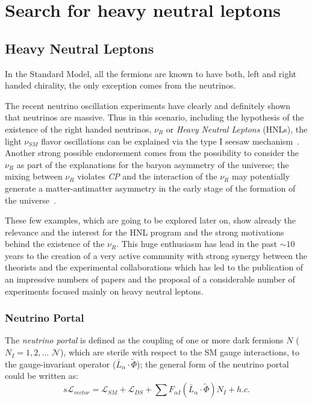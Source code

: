 
\part {Search for heavy neutral leptons}


\chapter{Heavy Neutral Leptons} 
\label{Chapter3} 


In the Standard Model, all the fermions are known to have both, left and right handed chirality, the only exception comes from the neutrinos.

The recent neutrino oscillation experiments have clearly and definitely shown that neutrinos are massive. Thus in this scenario, including the hypothesis of the existence of the right handed neutrinos, $\nu_{R}$ or \emph{Heavy Neutral Leptons} (HNLs), the light $\nu_{SM}$ flavor oscillations can be explained via the type I seesaw mechanism~\cite{MINKOWSKI1977421,gellmann2013complex,PhysRevLett.44.912,PhysRevD.22.2227}.
Another strong possible endorsement comes from the possibility to consider the $\nu_{R}$ as part of the explanations for the baryon asymmetry of the universe; the mixing between $\nu_{R}$ violates \emph{CP} and the interaction of the $\nu_{R}$ may potentially generate a matter-antimatter asymmetry in the early stage of the formation of the universe~\cite{Canetti_2012,KUZMIN198536}.

These few examples, which are going to be explored later on, show already the relevance and the interest for the HNL program and the strong motivations behind the existence of the $\nu_{R}$. This huge enthusiasm has lead in the past $\sim10$ years to the creation of a very active community with strong synergy between the theorists and the experimental collaborations which has led to the publication of an impressive numbers of papers and the proposal of a considerable number of experiments focused mainly on heavy neutral leptons. 

\section{Neutrino Portal} \label{sec:neutrinoPortal}
The \emph{neutrino portal} is defined as the coupling of one or more dark fermions $N$ ($N_{I} = 1,2,...$ $\mathcal{N}$), which are sterile with respect to the SM gauge interactions, to the gauge-invariant operator ($\bar{L}_{\alpha}  \cdot \widetilde \Phi$); the general form of the neutrino portal could be written as: 
\begin{equation}s
\label{eq:neutrinoportal}
\mathcal{L}_{vector} = \mathcal{L}_{SM} + \mathcal{L}_{DS} + \sum F_{\alpha I} (\bar{L}_{\alpha}  \cdot \widetilde \Phi)N_{I} + h.c.
\end{equation}

